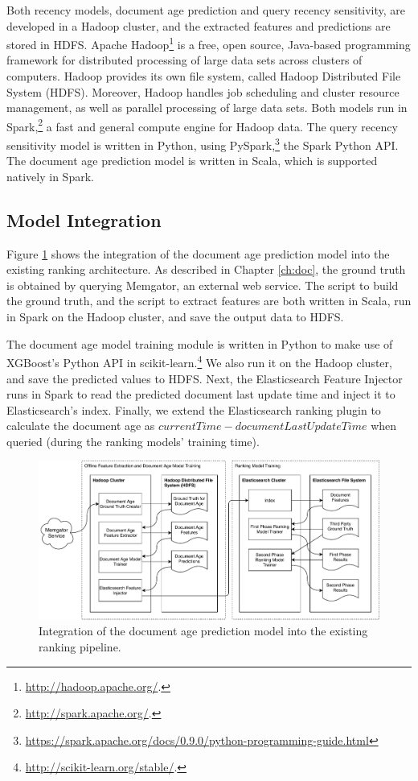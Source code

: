 Both recency models, document age prediction and query recency sensitivity, are developed in a Hadoop cluster, and the extracted features and predictions are stored in HDFS. Apache Hadoop\footnote{\url{http://hadoop.apache.org/}.} is a free, open source, Java-based programming framework for distributed processing of large data sets across clusters of computers. Hadoop provides its own file system, called Hadoop Distributed File System (HDFS). Moreover, Hadoop handles job scheduling and cluster resource management, as well as parallel processing of large data sets. Both models run in Spark,\footnote{\url{http://spark.apache.org/}.} a fast and general compute engine for Hadoop data. The query recency sensitivity model is written in Python, using PySpark,\footnote{\url{https://spark.apache.org/docs/0.9.0/python-programming-guide.html}} the Spark Python API. The document age prediction model is written in Scala, which is supported natively in Spark.

\subsection{Model Integration}
Figure \ref{fig:docmodel} shows the integration of the document age prediction model into the existing ranking architecture. As described in Chapter \ref{ch:doc}, the ground truth is obtained by querying Memgator, an external web service. The script to build the ground truth, and the script to extract features are both written in Scala, run in Spark on the Hadoop cluster, and save the output data to HDFS. 

The document age model training module is written in Python to make use of XGBoost's Python API in scikit-learn.\footnote{\url{http://scikit-learn.org/stable/}.} We also run it on the Hadoop cluster, and save the predicted values to HDFS. Next, the Elasticsearch Feature Injector runs in Spark to read the predicted document last update time and inject it to Elasticsearch's index. Finally, we extend the Elasticsearch ranking plugin to calculate the document age as $currentTime - documentLastUpdateTime$ when queried (during the ranking models' training time).

\begin{figure}
  \centering
  \includegraphics[width=\linewidth]{img/docmodel.pdf}
  \caption{Integration of the document age prediction model into the existing ranking pipeline.}
  \label{fig:docmodel}
\end{figure}

